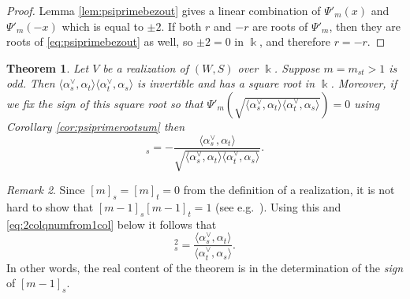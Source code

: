 \documentclass{amsart}
\theoremstyle{plain}
\newtheorem{thm}{Theorem}[section]
\theoremstyle{definition}
\theoremstyle{remark}
\newtheorem{rem}[thm]{Remark}
\numberwithin{equation}{section}
\newcommand{\ZZ}{\mathbb{Z}}
\begin{document}
\begin{proof}
Lemma \ref{lem:psiprimebezout} gives a linear combination of $\Psi'_m(x)$ and $\Psi'_m(-x)$ which is equal to $\pm 2$. 
If both $r$ and $-r$ are roots of $\Psi'_m$, then they are roots of \eqref{eq:psiprimebezout} as well, so $\pm 2=0$ in $\Bbbk$, and therefore $r=-r$.
\end{proof}

\begin{thm} \label{thm:mminus1twocol}
Let $V$ be a realization of $(W,S)$ over $\Bbbk$.
Suppose $m=m_{st}>1$ is odd.
Then $\langle \alpha_s^\vee, \alpha_t \rangle \langle \alpha_t^\vee, \alpha_s\rangle$ is invertible and has a square root in $\Bbbk$. 
Moreover, if we fix the sign of this square root so that $\Psi'_m(\sqrt{\langle \alpha_s^\vee, \alpha_t\rangle \langle \alpha_t^\vee, \alpha_s\rangle})=0$ using Corollary \ref{cor:psiprimerootsum} then 
\begin{equation}
[m-1]_s = -\frac{\langle \alpha_s^\vee,\alpha_t\rangle}{\sqrt{\langle \alpha_s^\vee, \alpha_t\rangle \langle \alpha_t^\vee, \alpha_s\rangle}} \text{.} \label{eq:mminus1sqrt}
\end{equation}
\end{thm}

\begin{rem}
Since $[m]_s=[m]_t=0$ from the definition of a realization, it is not hard to show that $[m-1]_s[m-1]_t=1$ (see e.g.~\cite[(6.11)]{ew-loccalc}).
Using this and \eqref{eq:2colqnumfrom1col} below it follows that
\begin{equation*}
[m-1]_s^2=\frac{\langle \alpha_s^\vee, \alpha_t\rangle}{\langle \alpha_t^\vee, \alpha_s \rangle} \text{.}
\end{equation*}
In other words, the real content of the theorem is in the determination of the \emph{sign} of $[m-1]_s$.
\end{rem}
\end{document}
